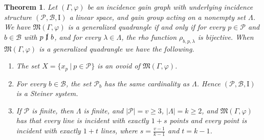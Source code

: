 \documentclass[11pt]{article}
\newtheorem{theorem}{Theorem}
\theoremstyle{definition}
\begin{document}
\begin{theorem}
Let $(\Gamma,\varphi)$ be an incidence gain graph with underlying incidence structure $(\mathscr{P},\mathscr{B},\mathrm{I})$ a linear space, and gain group acting on a nonempty set $\Lambda$.  We have $\mathfrak{M}(\Gamma,\varphi)$ is a generalized quadrangle if and only if for every $p \in \mathscr{P}$ and $b \in \mathscr{B}$ with $p \  \cancel{\mathrm{I}} \  b$, and for every $\lambda \in \Lambda$, the rho function $\rho_{b,p,\lambda}$ is bijective.  When $\mathfrak{M}(\Gamma,\varphi)$ is a generalized quadrangle we have the following.
\begin{enumerate}
\item The set $X = \{ x_p \  | \  p \in \mathscr{P} \}$ is an ovoid of $\mathfrak{M}(\Gamma,\varphi)$.
\item For every $b \in \mathscr{B}$, the set $\mathscr{P}_b$ has the same cardinality as $\Lambda$.  Hence $(\mathscr{P},\mathscr{B},\mathrm{I})$ is a Steiner system.
\item If $\mathscr{P}$ is finite, then $\Lambda$ is finite, and $|\mathscr{P}| = v \geq 3$, $|\Lambda| = k \geq 2$, and $\mathfrak{M}(\Gamma,\varphi)$ has that every line is incident with exactly $1+s$ points and every point is incident with exactly $1+t$ lines, where $\displaystyle s=\frac{v-1}{k-1}$ and $t=k-1$.
\end{enumerate}
\end{theorem}
\end{document}
